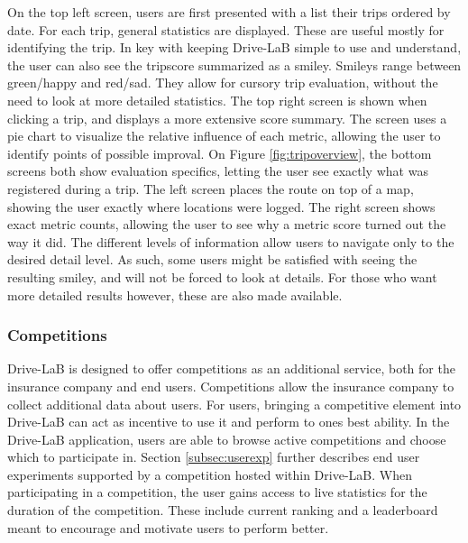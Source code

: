 On the top left screen, users are first presented with a list their trips ordered by date. For each trip, general statistics are displayed. These are useful mostly for identifying the trip. In key with keeping Drive-LaB simple to use and understand, the user can also see the tripscore summarized as a smiley. Smileys range between green/happy and red/sad. They allow for cursory trip evaluation, without the need to look at more detailed statistics.
The top right screen is shown when clicking a trip, and displays a more extensive score summary. The screen uses a pie chart to visualize the relative influence of each metric, allowing the user to identify points of possible improval.
On Figure \ref{fig:tripoverview}, the bottom screens both show evaluation specifics, letting the user see exactly what was registered during a trip. The left screen places the route on top of a map, showing the user exactly where locations were logged. The right screen shows exact metric counts, allowing the user to see why a metric score turned out the way it did.
The different levels of information allow users to navigate only to the desired detail level. As such, some users might be satisfied with seeing the resulting smiley, and will not be forced to look at details. For those who want more detailed results however, these are also made available.

\subsubsection{Competitions} \label{subsubsec:competitions}
Drive-LaB is designed to offer competitions as an additional service, both for the insurance company and end users. Competitions allow the insurance company to collect additional data about users. For users, bringing a competitive element into Drive-LaB can act as incentive to use it and perform to ones best ability. In the Drive-LaB application, users are able to browse active competitions and choose which to participate in. Section \ref{subsec:userexp} further describes end user experiments supported by a competition hosted within Drive-LaB. When participating in a competition, the user gains access to live statistics for the duration of the competition. These include current ranking and a leaderboard meant to encourage and motivate users to perform better.